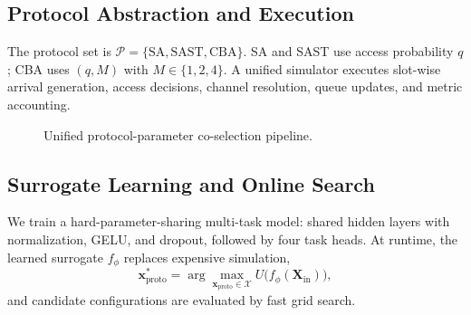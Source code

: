 \documentclass[conference]{IEEEtran}
\begin{document}
\subsection{Protocol Abstraction and Execution}
The protocol set is $\mathcal{P}=\{\mathrm{SA},\mathrm{SAST},\mathrm{CBA}\}$. SA and SAST use access probability $q$; CBA uses $(q,M)$ with $M\in\{1,2,4\}$. A unified simulator executes slot-wise arrival generation, access decisions, channel resolution, queue updates, and metric accounting.

\begin{figure}[t]
\centering
{}
\caption{Unified protocol-parameter co-selection pipeline.}
\label{fig:framework}
\end{figure}

\subsection{Surrogate Learning and Online Search}
We train a hard-parameter-sharing multi-task model: shared hidden layers with normalization, GELU, and dropout, followed by four task heads. At runtime, the learned surrogate $f_\phi$ replaces expensive simulation,
\begin{equation}
\mathbf{x}_{\mathrm{proto}}^*=\arg\max_{\mathbf{x}_{\mathrm{proto}}\in\mathcal{X}}U\big(f_\phi(\mathbf{X}_{\mathrm{in}})\big),
\end{equation}
and candidate configurations are evaluated by fast grid search.
\end{document}
